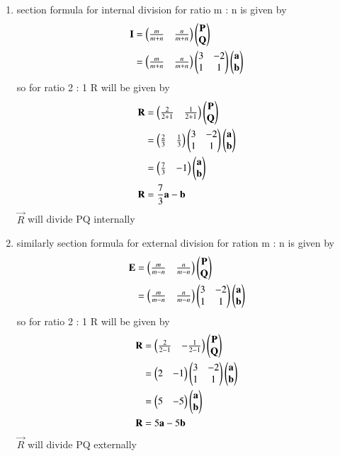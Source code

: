 \documentclass[journal,12pt,twocolumn]{IEEEtran}
\begin{document}
\begin{enumerate}
\item 
section formula for internal division for ratio m : n is given by 
\begin{align}
\mathbf{I} &= \begin{pmatrix}\frac{m}{m+n} & \frac{n}{m+n}\end{pmatrix}\begin{pmatrix}\mathbf{P}\\\mathbf{Q}\end{pmatrix}\\
&= \begin{pmatrix}\frac{m}{m+n} & \frac{n}{m+n}\end{pmatrix}\begin{pmatrix}3 & -2\\1 & 1\end{pmatrix}\begin{pmatrix}\mathbf{a} \\ \mathbf{b}\end{pmatrix}
\end{align}
so for ratio 2 : 1 R will be given by
\begin{align}
\mathbf{R} &= \begin{pmatrix}\frac{2}{2+1} & \frac{1}{2+1}\end{pmatrix}\begin{pmatrix}\mathbf{P}\\\mathbf{Q}\end{pmatrix}\\
&= \begin{pmatrix}\frac{2}{3}&\frac{1}{3}\end{pmatrix}\begin{pmatrix}3 & -2\\1 & 1\end{pmatrix}\begin{pmatrix}\mathbf{a} \\ \mathbf{b}\end{pmatrix}\\
&= \begin{pmatrix}\frac{7}{3} & -1\end{pmatrix}\begin{pmatrix}\mathbf{a} \\ \mathbf{b}\end{pmatrix}\\
\mathbf{R} &= \frac{7}{3}\mathbf{a} - \mathbf{b}
\end{align}
$\vec{R}$ will divide PQ internally\\
\item similarly section formula for external division for ration m : n is given by
\begin{align}
\mathbf{E} &= \begin{pmatrix}\frac{m}{m-n} & \frac{n}{m-n}\end{pmatrix}\begin{pmatrix}\mathbf{P}\\\mathbf{Q}\end{pmatrix}\\
&= \begin{pmatrix}\frac{m}{m-n} & \frac{n}{m-n}\end{pmatrix}\begin{pmatrix}3 & -2\\1 & 1\end{pmatrix}\begin{pmatrix}\mathbf{a} \\ \mathbf{b}\end{pmatrix}
\end{align}
so for ratio 2 : 1 R will be given by
\begin{align}
\mathbf{R} &= \begin{pmatrix}\frac{2}{2-1} & -\frac{1}{2-1}\end{pmatrix}\begin{pmatrix}\mathbf{P}\\\mathbf{Q}\end{pmatrix}\\
&= \begin{pmatrix}2 & -1\end{pmatrix}\begin{pmatrix}3 & -2\\1 & 1\end{pmatrix}\begin{pmatrix}\mathbf{a} \\ \mathbf{b}\end{pmatrix}\\
&= \begin{pmatrix}5 & -5\end{pmatrix}\begin{pmatrix}\mathbf{a} \\ \mathbf{b}\end{pmatrix}\\
\mathbf{R} &= 5\mathbf{a} - 5\mathbf{b}
\end{align}
$\vec{R}$ will divide PQ externally
\end{enumerate}
\end{document}

